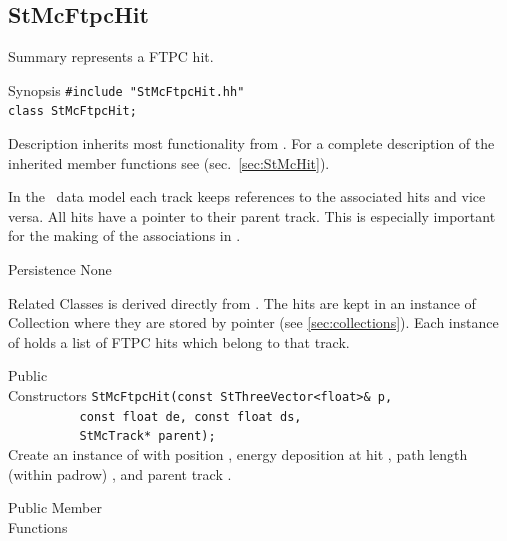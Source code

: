 \subsection{StMcFtpcHit}
 
\label{sec:StMcFtpcHit}
\begin{Entry}
\item[Summary]
     represents a FTPC hit.

\item[Synopsis]
    \verb+#include "StMcFtpcHit.hh"+\\
    \verb+class StMcFtpcHit;+\\

\item[Description]
     inherits most functionality from .  For a complete
    description of the inherited member functions see 
    (sec.~\ref{sec:StMcHit}).

In the \StMcEvent\ data model each track keeps references to the
    associated hits and vice versa. All hits have a pointer to their
    parent track.  This is especially important for the making of the
    associations in \StAssociationMaker.


\item[Persistence]
    None

\item[Related Classes]
     is derived directly from .
    The hits are kept in an instance of Collection
    where they are stored by pointer (see \ref{sec:collections}).
    Each instance of  holds a list of FTPC hits
    which belong to that track.

\item[Public\\ Constructors]
    \verb+StMcFtpcHit(const StThreeVector<float>& p,+\\
    \verb+          const float de, const float ds,+\\
    \verb+          StMcTrack* parent);+\\
    Create an instance of  with position ,
    energy deposition at hit , path length (within padrow) ,
    and parent track .

\item[Public Member\\ Functions]


\end{Entry}

